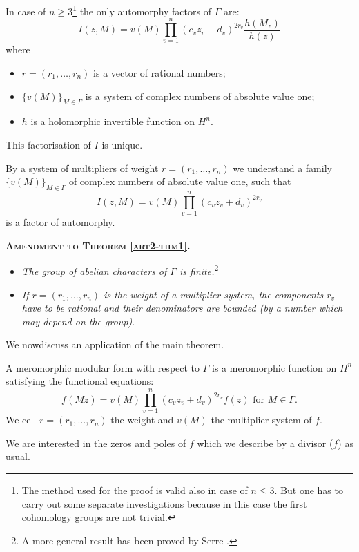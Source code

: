 \begin{theorem}\label{art2-thm1}%
In case of $n \geqslant 3$\footnote{The method used for the proof is valid also in case of $n \leq 3$. But one has to carry out some separate investigations because in this case the first cohomology groups are not trivial.} the only automorphy factors of $\Gamma$ are:
$$
I (z, M) = v (M) \prod^n_{v=1} (c_v z_v + d_v)^{2r_v} \frac{h(M_z)}{h(z)}
$$
where 
\begin{itemize}
\item[a)] $r = (r_1 , \ldots , r_n)$ is a vector of rational numbers;

\item[b)] $\{v (M)\}_{M \in \Gamma}$ is a system of complex numbers of absolute value one;

\item[c)] $h$ is a holomorphic invertible function on $H^n$.
\end{itemize}
This factorisation of $I$ is unique.
\end{theorem}

By a system of multipliers of weight $r = (r_1, \ldots, r_n)$ we understand a family $\{v (M)\}_{M \in \Gamma}$ of complex numbers of absolute value one, such that
$$
I(z, M) = v(M) \prod^n_{v=1} (c_v z_v + d_v)^{2r_v}
$$
is a factor of automorphy.

\medskip
\noindent
\textsc{\textbf{Amendment to Theorem \ref{art2-thm1}.}}

\begin{itemize}
\item[1)] \textit{The group of abelian characters of $\Gamma$ is finite.}\footnote{A more general result has been proved by Serre \cite{art2-key4}.}

\item[2)] \textit{If $r = (r_1, \ldots, r_n)$ is the weight of a multiplier system, the components $r_v$ have to be rational and their denominators are bounded (by a number which may depend on the group)}.
\end{itemize}

We now\pageoriginale discuss an application of the main theorem.

A meromorphic modular form with respect to $\Gamma$ is a meromorphic function on $H^n$ satisfying the functional equations:
$$
 f(Mz) = v (M) \prod^n_{v=1} (c_v z_v + d_v)^{2r_v} f (z) \text{ for } M \in \Gamma.
$$
We cell $r = (r_1, \ldots, r_n)$ the weight and $v(M)$ the multiplier system of $f$.

We are interested in the zeros and poles of $f$ which we describe by a divisor ($f$) as usual.

